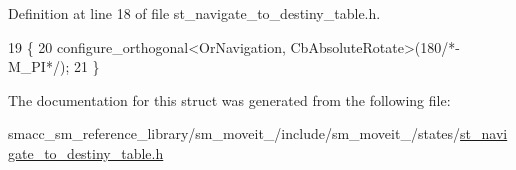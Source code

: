 Definition at line 18 of file st\+\_\+navigate\+\_\+to\+\_\+destiny\+\_\+table.\+h.


\begin{DoxyCode}
19     \{
20         configure\_orthogonal<OrNavigation, CbAbsoluteRotate>(180\textcolor{comment}{/*-M\_PI*/});
21     \}
\end{DoxyCode}


The documentation for this struct was generated from the following file\+:\begin{DoxyCompactItemize}
\item 
smacc\+\_\+sm\+\_\+reference\+\_\+library/sm\+\_\+moveit\+\_/include/sm\+\_\+moveit\+\_/states/\hyperlink{st__navigate__to__destiny__table_8h}{st\+\_\+navigate\+\_\+to\+\_\+destiny\+\_\+table.\+h}\end{DoxyCompactItemize}
